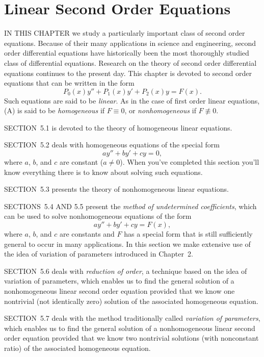 \chapter{Linear Second Order Equations}

\noindent
IN THIS CHAPTER we study a particularly important class of second order equations. Because of their
many applications in science and engineering, second order differential equations have historically
been the most thoroughly studied class of differential equations. Research on the theory of second
order differential equations continues to the present day. This chapter is devoted to second order
equations that can be written in the form
\[
  P_{0}(x)y''+P_{1}(x)y'+P_{2}(x)y=F(x).
\]
Such equations are said to be {\color{blue}\it linear\/}. As in the case of first order linear
equations, (A) is said to be {\color{blue}\it homogeneous\/} if $F\equiv0$, or {\color{blue}\it
nonhomogeneous\/} if $F\not\equiv0$.

\medskip
\noindent
SECTION~5.1 is devoted to the theory of homogeneous linear equations.

\medskip
\noindent
SECTION~5.2 deals with homogeneous equations of the special form
\[
  ay''+by'+cy=0,
\]
where $a$, $b$, and $c$ are constant ($a\ne0$). When you've completed this section you'll know
everything there is to know about solving such equations.

\medskip
\noindent
SECTION~5.3 presents the theory of nonhomogeneous linear equations.

\medskip
\noindent
SECTIONS~5.4 AND 5.5 present the {\color{blue}\it method of undetermined coefficients\/}, which can
be used to solve nonhomogeneous equations of the form
\[
  ay''+by'+cy=F(x),
\]
where $a$, $b$, and $c$ are constants and $F$ has a special form that is still sufficiently general
to occur in many applications. In this section we make extensive use of the idea of variation of
parameters introduced in Chapter~2.

\medskip
\noindent
SECTION~5.6 deals with {\color{blue}\it reduction of order\/}, a technique based on the idea of
variation of parameters, which enables us to find the general solution of a nonhomogeneous linear
second order equation provided that we know one nontrivial (not identically zero) solution of the
associated homogeneous equation.

\medskip
\noindent
SECTION~5.7 deals with the method traditionally called {\color{blue}\it variation of parameters\/},
which enables us to find the general solution of a nonhomogeneous linear second order equation
provided that we know two nontrivial solutions (with nonconstant ratio) of the associated
homogeneous equation.

\newpage














